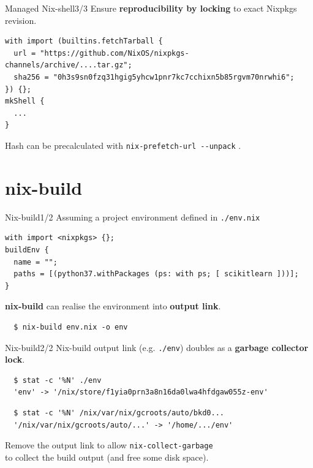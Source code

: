 \documentclass[12pt,aspectratio=169]{beamer}
\begin{document}
\begin{frame}[fragile]{Managed Nix-shell\hfill3/3}
  Ensure \textbf{reproducibility by locking} to exact Nixpkgs revision.
  \begin{verbatim}
with import (builtins.fetchTarball {
  url = "https://github.com/NixOS/nixpkgs-channels/archive/....tar.gz";
  sha256 = "0h3s9sn0fzq31hgig5yhcw1pnr7kc7cchixn5b85rgvm70nrwhi6";
}) {};
mkShell {
  ...
}
  \end{verbatim}
  Hash can be precalculated with \texttt{nix-prefetch-url -{}-unpack} .
\end{frame}


\section{nix-build}


\begin{frame}[fragile]{Nix-build\hfill1/2}
  Assuming a project environment defined in \texttt{./env.nix}
  \begin{verbatim}
with import <nixpkgs> {};
buildEnv {
  name = "";
  paths = [(python37.withPackages (ps: with ps; [ scikitlearn ]))];
}
  \end{verbatim}
  \textbf{nix-build} can realise the environment into \textbf{output link}.
  \begin{verbatim}
  $ nix-build env.nix -o env
  \end{verbatim}
\end{frame}


\begin{frame}[fragile]{Nix-build\hfill2/2}
  Nix-build output link (e.g. \texttt{./env}) doubles as a \textbf{garbage collector lock}.
  \begin{verbatim}
  $ stat -c '%N' ./env
  'env' -> '/nix/store/f1yia0prn3a8n16da0lwa4hfdgaw055z-env'
  \end{verbatim}
  \begin{verbatim}
  $ stat -c '%N' /nix/var/nix/gcroots/auto/bkd0...
  '/nix/var/nix/gcroots/auto/...' -> '/home/.../env'
  \end{verbatim}
  Remove the output link to allow \texttt{nix-collect-garbage} \\
  to collect the build output (and free some disk space).
\end{frame}
\end{document}

